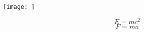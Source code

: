 \documentclass[12pt, a4paper]{article}
\begin{document}
\begin{center}
\texttt{[image: ]}
\label{fig:mpr}
\end{center}


\showsolution

\begin{solution}
\[
E = mc^2
\]
\[
F = ma
\]
\end{solution}
\end{document}
